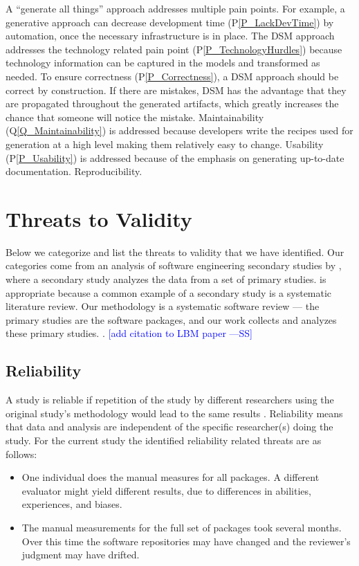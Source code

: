 \documentclass[final, 3p, times, authoryear]{elsarticle}
\newcommand{\authornote}[3]{\textcolor{#1}{[#3 ---#2]}}
\newcommand{\authornote}[3]{}
\newcommand{\wss}[1]{\authornote{blue}{SS}{#1}} %
\newcommand{\ppref}[1]{P\ref{#1}}
\newcommand{\qref}[1]{Q\ref{#1}}
\begin{document}
A ``generate all things'' approach addresses multiple pain points.  For example,
a generative approach can decrease development time (\ppref{P_LackDevTime}) by
automation, once the necessary infrastructure is in place.  The DSM approach
addresses the technology related pain point (\ppref{P_TechnologyHurdles})
because technology information can be captured in the models and transformed as
needed. To ensure correctness (\ppref{P_Correctness}), a DSM approach should be
correct by construction.  If there are mistakes, DSM has the advantage that they
are propagated throughout the generated artifacts, which greatly increases the
chance that someone will notice the mistake.  Maintainability
(\qref{Q_Maintainability}) is addressed because developers write the recipes
used for generation at a high level making them relatively easy to change.
Usability (\ppref{P_Usability}) is addressed because of the emphasis on
generating up-to-date documentation.  Reproducibility.

\section{Threats to Validity} \label{sec_threats_to_validity}

Below we categorize and list the threats to validity that we have identified.
Our categories come from an analysis of software engineering secondary studies
by \citet{AmpatzoglouEtAl2019}, where a secondary study analyzes the data from a
set of primary studies.  \citet{AmpatzoglouEtAl2019} is appropriate because a
common example of a secondary study is a systematic literature review. Our
methodology is a systematic software review --- the primary studies
are the software packages, and our work collects and analyzes these primary
studies.  \citep{SmithEtAl2022}.  \wss{add citation to LBM paper}

\subsection{Reliability}

A study is reliable if repetition of the study by different researchers using
the original study's methodology would lead to the same results
\citep{RunesonAndHost2009}. Reliability means that data and analysis are
independent of the specific researcher(s) doing the study.  For the current
study the identified reliability related threats are as follows:

\begin{itemize}
\item One individual does the manual measures for all packages. A different
evaluator might yield different results, due to differences in abilities,
experiences, and biases.
\item The manual measurements for the full set of packages took several months.
Over this time the software repositories may have changed and the reviewer's
judgment may have drifted.
\end{itemize}
\end{document}
